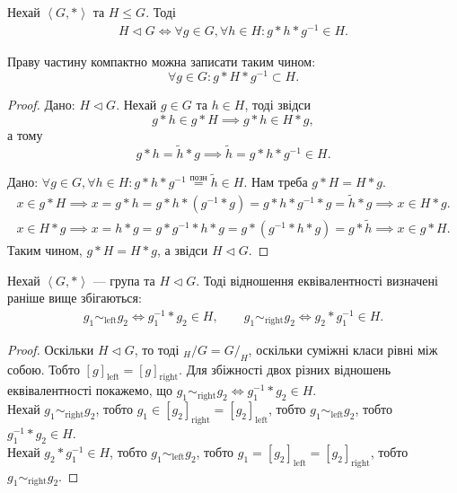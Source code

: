 \documentclass{math_library}
\begin{document}

\begin{theorem}
Нехай $\left<G,* \right>$ та $H \leq G$. Тоді
\begin{align*}
H \triangleleft G \iff \forall g \in G, \forall h \in H: g*h*g^{-1} \in H.
\end{align*}
\end{theorem}

\begin{remark}
Праву частину компактно можна записати таким чином: 
\[
\forall g \in G: g*H*g^{-1} \subset H.
\]
\end{remark}

\begin{proof}
\rightproof Дано: $H \triangleleft G$. Нехай $g \in G$ та $h \in H$, тоді звідси \[
g*h \in g*H \implies g*h \in H*g,
\] а тому 
\[
g*h = \tilde{h}*g \implies \tilde{h} = g*h*g^{-1} \in H.
\]

\leftproof Дано: $\forall g \in G, \forall h \in H: g*h*g^{-1} \overset{\text{позн}}{=} \tilde{h} \in H$. Нам треба $g*H = H*g$.
\begin{align*}
x \in g*H \implies x = g*h = g*h*(g^{-1}*g) = g*h*g^{-1}*g = \tilde{h}*g \implies x \in H*g. \\
x \in H*g \implies x = h*g = g*g^{-1}*h*g = g*(g^{-1}*h*g) = g*\tilde{h} \implies x \in g*H.
\end{align*}
Таким чином, $g*H = H*g$, а звідси $H \triangleleft G$.
\end{proof}

\begin{corollary}
Нехай $\left< G, * \right>$ --- група та $H \triangleleft G$. Тоді відношення еквівалентності визначені раніше вище збігаються:
\begin{align*}
g_1 \sim_{\text{left}} g_2 \iff g_1^{-1}*g_2 \in H, \qquad g_1 \sim_{\text{right}} g_2 \iff g_2*g_1^{-1} \in H.
\end{align*}
\end{corollary}

\begin{proof}
Оскільки $H \triangleleft G$, то тоді ${}_{H}/G = G/_H$, оскільки суміжні класи рівні між собою. Тобто $[g]_{\text{left}} = [g]_{\text{right}}$. Для збіжності двох різних відношень еквівалентності покажемо, що $g_1 \sim_{\text{right}} g_2 \iff g_1^{-1}*g_2 \in H$.\\
Нехай $g_1 \sim_{\text{right}} g_2$, тобто $g_1 \in [g_2]_{\text{right}} = [g_2]_{\text{left}}$, тобто $g_1 \sim_{\text{left}} g_2$, тобто $g_1^{-1}*g_2 \in H$.\\
Нехай $g_2*g_1^{-1} \in H$, тобто $g_1 \sim_{\text{left}} g_2$, тобто $g_1 = [g_2]_{\text{left}} = [g_2]_{\text{right}}$, тобто $g_1 \sim_{\text{right}} g_2$.
\end{proof}
\end{document}
